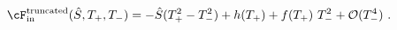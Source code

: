 \begin{equation}\label{Fexptrunc}
\cF^{\rm truncated}_{\rm in}(\hat{S},T_+,T_{-}) =
-\hat{S}(T_{+}^{2}-T_{-}^{2})+h(T_+) + f(T_+)\ T_{-}^{2} + {\cal
O}(T_{-}^{4}) \ .
\end{equation}

